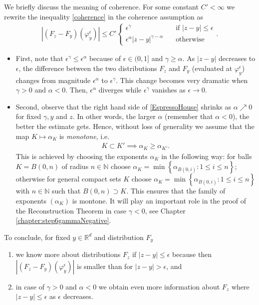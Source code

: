 We briefly discuss the meaning of coherence. For some constant $C' < \infty$ we rewrite the inequality \eqref{coherence} in the coherence assumption as
\begin{align}\label{EspressoHouse}
    |(F_z - F_y)(\varphi^\epsilon_y)| \leq C' \begin{cases}
        \epsilon^\gamma \quad & \text{if $|z-y| \leq \epsilon$} \\
        \epsilon^{\alpha} |z-y|^{\gamma - \alpha} \quad & \text{otherwise}
    \end{cases}.
\end{align}
\begin{itemize}
    \item First, note that $\epsilon^{\gamma} \leq \epsilon^{\alpha}$ because of $\epsilon \in (0,1]$ and $\gamma \geq \alpha$. As $|z-y|$ decreases to $\epsilon$, the difference between the two distributions $F_z$ and $F_y$ (evaluated at $\varphi^\epsilon_y$) changes from magnitude $\epsilon^\alpha$ to $\epsilon^{\gamma}$. This change becomes very dramatic when $\gamma > 0$ and $\alpha < 0$. Then, $\epsilon^{\alpha}$ diverges while $\epsilon^{\gamma}$ vanishes as $\epsilon \to 0$.
    \item Second, observe that the right hand side of \eqref{EspressoHouse} shrinks as $\alpha \nearrow 0$ for fixed $\gamma, y$ and $z$. In other words, the larger $\alpha$ (remember that $\alpha < 0$), the better the estimate gets. Hence, without loss of generality we assume that the map $K \mapsto \alpha_K$ is \emph{monotone}, i.e. 
    \begin{align}\label{alpha-monotone}
        K \subset K' \implies \alpha_K \geq \alpha_{K'}.
    \end{align}
    This is achieved by choosing the exponents $\alpha_K$ in the following way: for balls $K = B(0,n)$ of radius $n \in \mathbb{N}$ choose $\alpha_K = \min\left\{ \alpha_{B(0,i)}  : 1\leq i \leq n\right\}$; otherwise for general compact sets $K$ choose $\alpha_K = \min\left\{ \alpha_{B(0,i)}  : 1\leq i \leq n\right\}$ with $n \in \mathbb{N}$ such that  $B(0,n) \supset K$. This ensures that the family of exponents $(\alpha_K)$ is montone. It will play an important role in the proof of the Reconstruction Theorem in case $\gamma < 0$, see Chapter \ref{chapter:step6gammaNegative}.
\end{itemize}

To conclude, for fixed $y \in \mathbb{R}^d$ and distribution $F_y$
\begin{enumerate}
    \item we know more about distributions $F_z$ if $|z - y | \leq \epsilon$ because then $|(F_z - F_y)(\varphi^\epsilon_y)|$ is smaller than for $|z - y| > \epsilon$, and
    \item in case of $\gamma > 0$ and $\alpha < 0$ we obtain even more information about $F_z$ where $|z - y | \leq \epsilon$  as $\epsilon$ decreases.
\end{enumerate}

